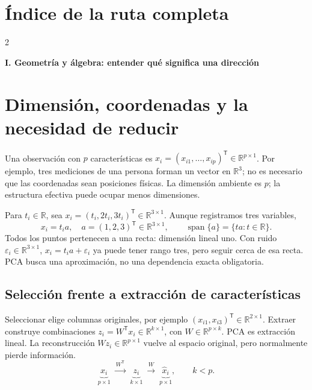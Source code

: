 \documentclass[11pt,a4paper]{article}
\newcommand{\R}{\mathbb R}
\newcommand{\T}{^{\mathsf T}}
\DeclareMathOperator{\spanop}{span}
\theoremstyle{definition}
\newcommand{\parte}[1]{\par\bigskip\Needspace{8\baselineskip}\begin{center}{\Large\bfseries\color{azul}#1}\end{center}}
\begin{document}
\setcounter{tocdepth}{1}
\section*{Índice de la ruta completa}
\begin{multicols}{2}\footnotesize\setlength{\parskip}{0pt}
\makeatletter
\renewcommand*\l@section[2]{\@dottedtocline{1}{0pt}{1.9em}{#1}{#2}}
\makeatother
\end{multicols}

\parte{I. Geometría y álgebra: entender qué significa una dirección}
\section{Dimensión, coordenadas y la necesidad de reducir}
Una observación con $p$ características es $x_i=(x_{i1},\ldots,x_{ip})\T\in\R^{p\times1}$. Por ejemplo, tres mediciones de una persona forman un vector en $\R^3$; no es necesario que las coordenadas sean posiciones físicas. La dimensión ambiente es $p$; la estructura efectiva puede ocupar menos dimensiones.
\begin{ejemplo}
Para $t_i\in\R$, sea $x_i=(t_i,2t_i,3t_i)\T\in\R^{3\times1}$. Aunque registramos tres variables,
\[
x_i=t_i a,\quad a=(1,2,3)\T\in\R^{3\times1},\qquad
\spanop\{a\}=\{ta:t\in\R\}.
\]
Todos los puntos pertenecen a una recta: dimensión lineal uno. Con ruido $\varepsilon_i\in\R^{3\times1}$, $x_i=t_i a+\varepsilon_i$ ya puede tener rango tres, pero seguir cerca de esa recta. PCA busca una aproximación, no una dependencia exacta obligatoria.
\end{ejemplo}
\subsection{Selección frente a extracción de características}
Seleccionar elige columnas originales, por ejemplo $(x_{i1},x_{i3})\T\in\R^{2\times1}$. Extraer construye combinaciones $z_i=W\T x_i\in\R^{k\times1}$, con $W\in\R^{p\times k}$. PCA es extracción lineal. La reconstrucción $Wz_i\in\R^{p\times1}$ vuelve al espacio original, pero normalmente pierde información.
\[
\underbrace{x_i}_{p\times1}\ \xrightarrow{\ W\T\ }\
\underbrace{z_i}_{k\times1}\ \xrightarrow{\ W\ }\
\underbrace{\widehat x_i}_{p\times1},\qquad k<p.
\]
\end{document}
